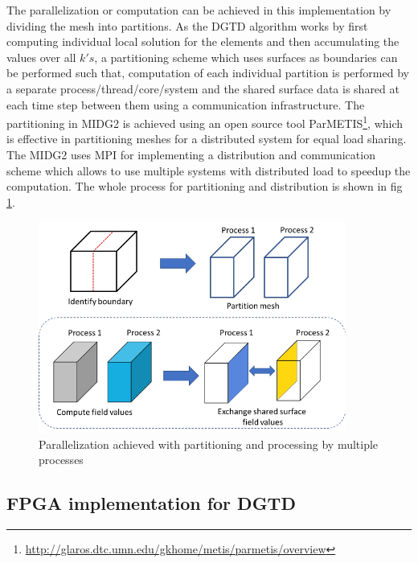 The parallelization or computation can be achieved in this implementation by dividing
the mesh into partitions. As the \ac{DGTD} algorithm works by first computing individual
local solution for the elements and then accumulating the values over all $k's$,
a partitioning scheme which uses surfaces as boundaries can be performed such that,
computation of each individual partition is performed by a separate
process/thread/core/system and the shared surface data is shared at each time step
between them using a communication infrastructure. The partitioning in MIDG2 is
achieved using an open source tool ParMETIS\footnote{\url{http://glaros.dtc.umn.edu/gkhome/metis/parmetis/overview}},
which is effective in partitioning meshes for a distributed system for equal load sharing.
The MIDG2 uses \ac{MPI} for implementing a distribution and communication scheme which
allows to use multiple systems with distributed load to speedup the computation.
The whole process for partitioning and distribution is shown in fig \ref{fig:partitioning}.
\begin{figure}[h]%
    \centering
    \includegraphics[width=0.9\textwidth]{images/partition_proc}
    \caption{Parallelization achieved with partitioning and processing by multiple processes}
    \label{fig:partitioning}
\end{figure}

\subsection{FPGA implementation for DGTD}

